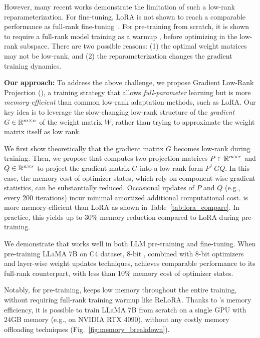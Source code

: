 However, many recent works demonstrate the limitation of such a low-rank reparameterization. For fine-tuning, LoRA is not shown to reach a comparable performance as full-rank fine-tuning~\cite{xiaChainLoRAEfficient2024}.
For pre-training from scratch, it is shown to require a full-rank model training as a warmup \citep{lialinReLoRAHighRankTraining2023}, before optimizing in the low-rank subspace. There are two possible reasons: (1) the optimal weight matrices may not be low-rank, and (2) the reparameterization changes the gradient training dynamics.



{\bf Our approach: }To address the above challenge, we propose Gradient Low-Rank Projection (\textbf{\lowrank}), a training strategy that allows \emph{full-parameter} learning but is more \emph{memory-efficient} than common low-rank adaptation methods, such as LoRA. Our key idea is to leverage the slow-changing low-rank structure of the \emph{gradient} $G\in\mathbb{R}^{m\times n}$ of the weight matrix $W$, rather than trying to approximate the weight matrix itself as low rank. 

We first show theoretically that the gradient matrix $G$ becomes low-rank during training. Then, we propose \lowrank{} that computes two projection matrices $P\in \mathbb{R}^{m\times r}$ and $Q\in \mathbb{R}^{n\times r}$ to project the gradient matrix $G$ into a low-rank form $P^\top G Q$.
In this case, the memory cost of optimizer states, which rely on component-wise gradient statistics, can be substantially reduced. Occasional updates of $P$ and $Q$ (e.g., every 200 iterations) incur minimal amortized additional computational cost.
\lowrank is more memory-efficient than LoRA as shown in Table~\ref{tab:lora_compare}.
In practice, this yields up to 30\% memory reduction compared to LoRA during pre-training.




We demonstrate that \lowrank{} works well in both LLM pre-training and fine-tuning. When pre-training LLaMA 7B on C4 dataset, 8-bit \lowrank, combined with 8-bit optimizers and layer-wise weight updates techniques, achieves comparable performance to its full-rank counterpart, with less than 10\% memory cost of optimizer states. 

Notably, for pre-training, \lowrank{} keeps low memory throughout the entire training, without requiring full-rank training warmup like ReLoRA.  
Thanks to \lowrank's memory efficiency, it is possible to train LLaMA 7B from scratch on a single GPU with 24GB memory (e.g., on NVIDIA RTX 4090), without any costly memory offloading techniques (Fig.~\ref{fig:memory_breakdown}).

